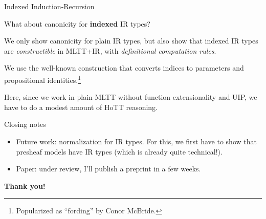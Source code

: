 \documentclass[dvipsnames,aspectratio=169]{beamer}
\begin{document}
\begin{frame}{Indexed Induction-Recursion}

What about canonicity for \textbf{indexed} IR types?
\vspace{1em}

We only show canonicity for plain IR types, but also show that indexed IR types are
\emph{constructible} in MLTT+IR, with \emph{definitional computation rules}.

\vspace{1em}
We use the well-known construction that converts indices to parameters and propositional identities.\footnote{Popularized as ``fording'' by Conor McBride.}

\vspace{1em}
Here, since we work in plain MLTT without function extensionality and UIP, we have to do a modest amount of HoTT reasoning.

\end{frame}

\begin{frame}{Closing notes}

\vspace{-1em}
\begin{itemize}
\item Future work: normalization for IR types. For this, we first have to show that presheaf models have IR types (which is already quite technical!).
\item Paper: under review, I'll publish a preprint in a few weeks.
\end{itemize}
\vspace{3em}
\pause

\begin{center}
  \Large{\textbf{Thank you!}}
\end{center}
\end{frame}



\end{document}
